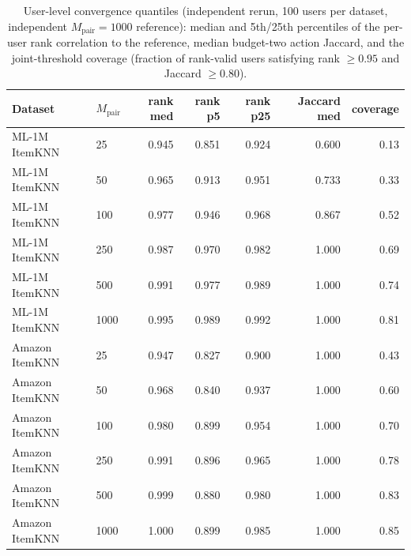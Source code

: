 \begin{table}[!htbp]\centering\scriptsize\setlength{\tabcolsep}{3pt}
\caption{User-level convergence quantiles (independent rerun, 100 users per
dataset, independent $M_{\mathrm{pair}}=1000$ reference): median and 5th/25th
percentiles of the per-user rank correlation to the reference, median
budget-two action Jaccard, and the joint-threshold coverage (fraction of
rank-valid users satisfying rank $\ge0.95$ and Jaccard $\ge0.80$).}
\label{tab:review5-convergence}
\begin{tabular}{@{}llrrrrr@{}}
\toprule
Dataset & $M_{\mathrm{pair}}$ & rank med & rank p5 & rank p25 & Jaccard med & coverage \\
\midrule
ML-1M ItemKNN & 25 & 0.945 & 0.851 & 0.924 & 0.600 & 0.13 \\
ML-1M ItemKNN & 50 & 0.965 & 0.913 & 0.951 & 0.733 & 0.33 \\
ML-1M ItemKNN & 100 & 0.977 & 0.946 & 0.968 & 0.867 & 0.52 \\
ML-1M ItemKNN & 250 & 0.987 & 0.970 & 0.982 & 1.000 & 0.69 \\
ML-1M ItemKNN & 500 & 0.991 & 0.977 & 0.989 & 1.000 & 0.74 \\
ML-1M ItemKNN & 1000 & 0.995 & 0.989 & 0.992 & 1.000 & 0.81 \\
Amazon ItemKNN & 25 & 0.947 & 0.827 & 0.900 & 1.000 & 0.43 \\
Amazon ItemKNN & 50 & 0.968 & 0.840 & 0.937 & 1.000 & 0.60 \\
Amazon ItemKNN & 100 & 0.980 & 0.899 & 0.954 & 1.000 & 0.70 \\
Amazon ItemKNN & 250 & 0.991 & 0.896 & 0.965 & 1.000 & 0.78 \\
Amazon ItemKNN & 500 & 0.999 & 0.880 & 0.980 & 1.000 & 0.83 \\
Amazon ItemKNN & 1000 & 1.000 & 0.899 & 0.985 & 1.000 & 0.85 \\
\bottomrule
\end{tabular}
\end{table}